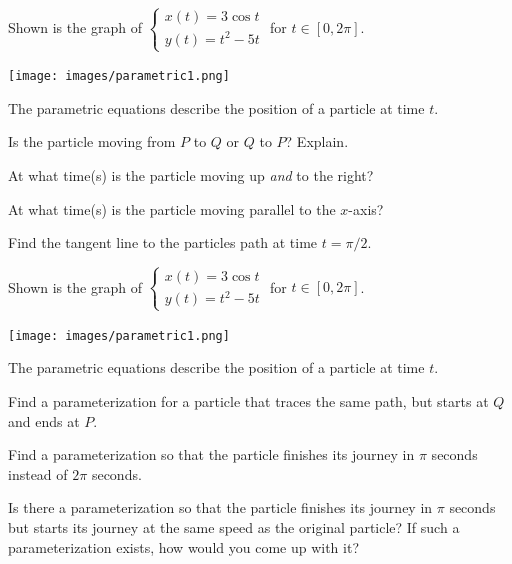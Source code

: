 \documentclass{workbook}
\begin{document}
\begin{slide}
	\question

		Shown is the graph of $\displaystyle
		\begin{cases}
			x(t)=3\cos t \\
			y(t)=t^2-5t
		\end{cases}
		$
		for $t\in[0,2\pi]$.
		\begin{center}
	\texttt{[image: images/parametric1.png]}
		\end{center}

	
	The parametric equations describe the position of a particle at time $t$.

	\begin{parts}
		\item Is the particle moving from $P$ to $Q$ or $Q$ to $P$? Explain.

		\item At what time(s) is the particle moving up \emph{and} to the right?

		\item At what time(s) is the particle moving parallel to the $x$-axis?

		\item Find the tangent line to the particles path at time $t=\pi/2$.
		
	\end{parts}
\end{slide}


\begin{slide}
	\question

		Shown is the graph of $\displaystyle
		\begin{cases}
			x(t)=3\cos t \\
			y(t)=t^2-5t
		\end{cases}
		$
		for $t\in[0,2\pi]$.
		\begin{center}
	\texttt{[image: images/parametric1.png]}
		\end{center}

	
	The parametric equations describe the position of a particle at time $t$.

	\begin{parts}
		\item Find a parameterization for a particle that traces the same path,
		but starts at $Q$ and ends at $P$.

		\item Find a parameterization so that the particle finishes its journey in $\pi$ seconds instead of $2\pi$ seconds.

		\item Is there a parameterization so that the particle
		finishes its journey in $\pi$ seconds but starts its journey at
		the same speed as the original particle? If such a parameterization exists, how would you come up with it?
		
	\end{parts}
\end{slide}
\end{document}
